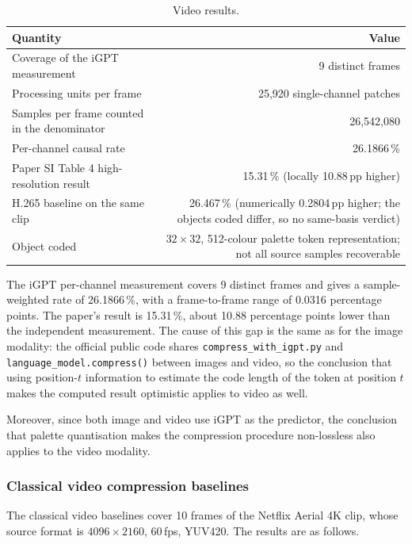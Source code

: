 \documentclass[12pt,a4paper]{article}
\begin{document}
\begin{table}[htbp]\centering\small
\caption{Video results.}
\begin{tabular}{@{}lr@{}}
\toprule
Quantity & Value \\
\midrule
Coverage of the iGPT measurement & 9 distinct frames \\
Processing units per frame & 25{,}920 single-channel patches \\
Samples per frame counted in the denominator & 26{,}542{,}080 \\
Per-channel causal rate & 26.1866\,\% \\
Paper SI Table 4 high-resolution result & 15.31\,\% (locally 10.88\,pp higher) \\
H.265 baseline on the same clip & 26.467\,\% (numerically 0.2804\,pp higher; the objects coded differ, so no same-basis verdict) \\
Object coded & $32\times32$, 512-colour palette token representation; not all source samples recoverable \\
\bottomrule
\end{tabular}
\end{table}

The iGPT per-channel measurement covers 9 distinct frames and gives a sample-weighted rate of
26.1866\,\%, with a frame-to-frame range of 0.0316 percentage points. The paper's result is
15.31\,\%, about 10.88 percentage points lower than the independent measurement. The cause of
this gap is the same as for the image modality: the official public code shares
\texttt{compress\_with\_igpt.py} and \texttt{language\_model.compress()} between images and
video, so the conclusion that using position-$t$ information to estimate the code length of the
token at position $t$ makes the computed result optimistic applies to video as well.

Moreover, since both image and video use iGPT as the predictor, the conclusion that palette
quantisation makes the compression procedure non-lossless also applies to the video modality.

\subsubsection{Classical video compression baselines}

The classical video baselines cover 10 frames of the Netflix Aerial 4K clip, whose source format
is $4096\times2160$, 60\,fps, YUV420. The results are as follows.
\end{document}
